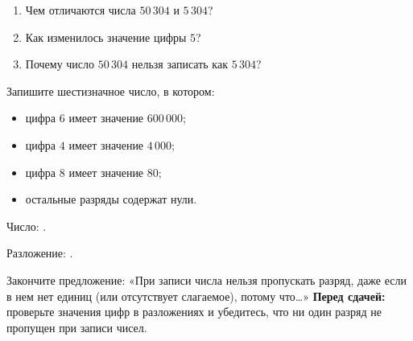 \begin{practicebox}
  \begin{enumerate}[label=\textbf{\arabic*.}]
    \item Чем отличаются числа \(50\,304\) и \(5\,304\)?
    \item Как изменилось значение цифры \(5\)?
    \item Почему число \(50\,304\) нельзя записать как \(5\,304\)?
  \end{enumerate}
\end{practicebox}

\begin{practicebox}
  Запишите шестизначное число, в котором:
  \begin{itemize}
    \item цифра \(6\) имеет значение \(600\,000\);
    \item цифра \(4\) имеет значение \(4\,000\);
    \item цифра \(8\) имеет значение \(80\);
    \item остальные разряды содержат нули.
  \end{itemize}
  Число: \answerblank[35mm].

  Разложение: \answerblank[75mm].
\end{practicebox}

\begin{checkpointbox}
  Закончите предложение: «При записи числа нельзя пропускать разряд, даже если в нем нет единиц (или отсутствует слагаемое), потому что…»
  \textbf{Перед сдачей:} проверьте значения цифр в разложениях и убедитесь, что ни один разряд не пропущен при записи чисел.
\end{checkpointbox}
